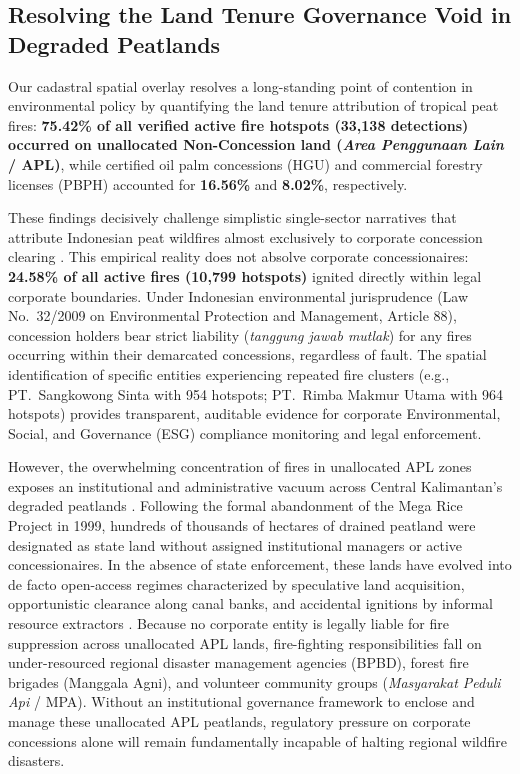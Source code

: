 \subsection{Resolving the Land Tenure Governance Void in Degraded Peatlands}
\label{subsec:disc_tenure}

Our cadastral spatial overlay resolves a long-standing point of contention in environmental policy by quantifying the land tenure attribution of tropical peat fires: \textbf{75.42\% of all verified active fire hotspots (33,138 detections) occurred on unallocated Non-Concession land (\textit{Area Penggunaan Lain} / APL)}, while certified oil palm concessions (HGU) and commercial forestry licenses (PBPH) accounted for \textbf{16.56\%} and \textbf{8.02\%}, respectively.

These findings decisively challenge simplistic single-sector narratives that attribute Indonesian peat wildfires almost exclusively to corporate concession clearing \citep{Tacconi2003CIFOR, Carlson2012PNAS}. This empirical reality does not absolve corporate concessionaires: \textbf{24.58\% of all active fires (10,799 hotspots)} ignited directly within legal corporate boundaries. Under Indonesian environmental jurisprudence (Law No.~32/2009 on Environmental Protection and Management, Article 88), concession holders bear strict liability (\textit{tanggung jawab mutlak}) for any fires occurring within their demarcated concessions, regardless of fault. The spatial identification of specific entities experiencing repeated fire clusters (e.g., PT.~Sangkowong Sinta with 954 hotspots; PT.~Rimba Makmur Utama with 964 hotspots) provides transparent, auditable evidence for corporate Environmental, Social, and Governance (ESG) compliance monitoring and legal enforcement.

However, the overwhelming concentration of fires in unallocated APL zones exposes an institutional and administrative vacuum across Central Kalimantan's degraded peatlands \citep{Cattau2016GCB, Putranto2023LandUsePol}. Following the formal abandonment of the Mega Rice Project in 1999, hundreds of thousands of hectares of drained peatland were designated as state land without assigned institutional managers or active concessionaires. In the absence of state enforcement, these lands have evolved into de facto open-access regimes characterized by speculative land acquisition, opportunistic clearance along canal banks, and accidental ignitions by informal resource extractors \citep{Cattau2016GCB}. Because no corporate entity is legally liable for fire suppression across unallocated APL lands, fire-fighting responsibilities fall on under-resourced regional disaster management agencies (BPBD), forest fire brigades (Manggala Agni), and volunteer community groups (\textit{Masyarakat Peduli Api} / MPA). Without an institutional governance framework to enclose and manage these unallocated APL peatlands, regulatory pressure on corporate concessions alone will remain fundamentally incapable of halting regional wildfire disasters.

